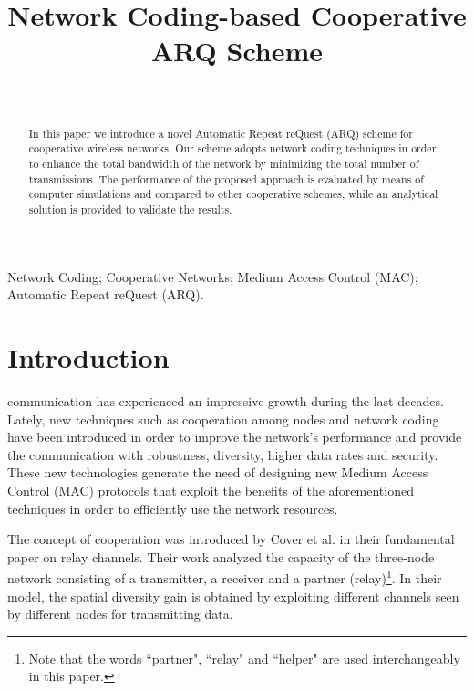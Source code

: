 \documentclass[conference]{IEEEtran}
\begin{document}
\title{Network Coding-based Cooperative ARQ Scheme}

\author{
\\
}


\maketitle              


\begin{abstract}
In this paper we introduce a novel Automatic Repeat reQuest (ARQ) scheme for cooperative wireless networks. Our scheme adopts network coding techniques in order to enhance the total bandwidth of the network by minimizing the total number of transmissions. The performance of the proposed approach is evaluated by means of computer simulations and compared to other cooperative schemes, while an analytical solution is provided to validate the results.
\end{abstract}


\begin{IEEEkeywords}
Network Coding; Cooperative Networks; Medium Access Control (MAC); Automatic Repeat reQuest (ARQ).
\end{IEEEkeywords}


\IEEEpeerreviewmaketitle



\section{Introduction}
\label{sec:intro}


 communication has experienced an impressive growth during the last decades. Lately, new techniques such as cooperation among nodes and network coding have been introduced in order to improve the network's performance and provide the communication with robustness, diversity, higher data rates and security. These new technologies generate the need of designing new Medium Access Control (MAC) protocols that exploit the benefits of the aforementioned techniques in order to efficiently use the network resources.

The concept of cooperation was introduced by Cover et al. \cite{IEEEhowto:coop} in their fundamental paper on relay channels. Their work analyzed the capacity of the three-node network consisting of a transmitter, a receiver and a partner (relay)\footnote[1]{Note that the words ``partner", ``relay" and ``helper" are used interchangeably in this paper.}. In their model, the spatial diversity gain is obtained by exploiting different channels seen by different nodes for transmitting data.
\end{document}
